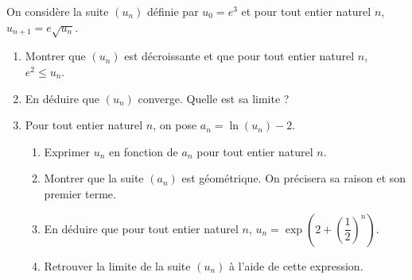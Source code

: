 \documentclass[11pt,fleqn, openany]{book} %
\begin{document}
\begin{exercise}On considère la suite $(u_n)$ définie par $u_0=e^3$ et pour tout entier naturel $n$, $u_{n+1}=e\sqrt{u_n}$.
\begin{enumerate}
\item Montrer que $(u_n)$ est décroissante et que pour tout entier naturel $n$, $e^2 \leqslant u_n$.
\item En déduire que $(u_n)$ converge. Quelle est sa limite ?
\item Pour tout entier naturel $n$, on pose $a_n=\ln(u_n)-2$.
\begin{enumerate}
\item Exprimer $u_n$ en fonction de $a_n$ pour tout entier naturel $n$.
\item Montrer que la suite $(a_n)$ est géométrique. On précisera sa raison et son premier terme.
\item En déduire que pour tout entier naturel $n$, $u_n=\exp \left(2 + \left(\dfrac{1}{2}\right)^n\right)$.
\item Retrouver la limite de la suite $(u_n)$ à l'aide de cette expression.
\end{enumerate}
\end{enumerate} \end{exercise}
\end{document}
